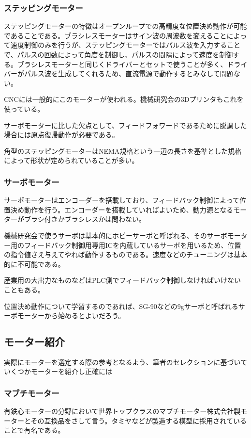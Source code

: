 \documentclass[a4paper,titlepage,here]{ujarticle}
\begin{document}
\subsubsection{ステッピングモーター}
ステッピングモーターの特徴はオープンループでの高精度な位置決め動作が可能であることである。ブラシレスモーターはサイン波の周波数を変えることによって速度制御のみを行うが、ステッピングモーターではパルス波を入力することで、パルスの回数によって角度を制御し、パルスの間隔によって速度を制御する。ブラシレスモーターと同じくドライバーとセットで使うことが多く、ドライバーがパルス波を生成してくれるため、直流電源で動作するとみなして問題ない。

CNCには一般的にこのモーターが使われる。機械研究会の3Dプリンタもこれを使っている。

サーボモーターに比した欠点として、フィードフォワードであるために脱調した場合には原点復帰動作が必要である。

角型のステッピングモーターはNEMA規格という一辺の長さを基準とした規格によって形状が定められていることが多い。
\subsubsection{サーボモーター}
サーボモーターはエンコーダーを搭載しており、フィードバック制御によって位置決め動作を行う。エンコーダーを搭載していればよいため、動力源となるモーターがブラシ付きかブラシレスかは問わない。

機械研究会で使うサーボは基本的にホビーサーボと呼ばれる、そのサーボモーター用のフィードバック制御用専用ICを内蔵しているサーボを用いるため、位置の指令値さえ与えてやれば動作するものである。速度などのチューニングは基本的に不可能である。

産業用の大出力なものなどはPLC側でフィードバック制御しなければいけないこともある。

位置決め動作について学習するのであれば、SG-90などの9gサーボと呼ばれるサーボモーターから始めるとよいだろう。
\subsection{モーター紹介}
実際にモーターを選定する際の参考となるよう、筆者のセレクションに基づいていくつかモーターを紹介し正確には
\subsubsection{マブチモーター}
有鉄心モーターの分野において世界トップクラスのマブチモーター株式会社製モーターとその互換品をさして言う。タミヤなどが製造する模型に採用されていることで有名である。
\end{document}
